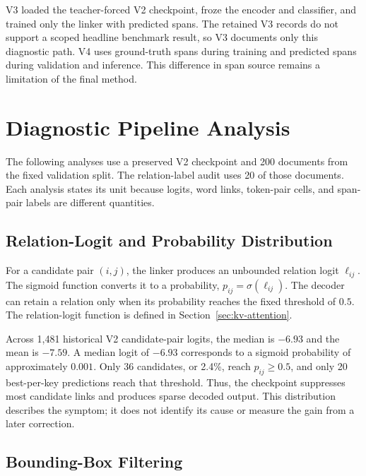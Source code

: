 V3 loaded the teacher-forced V2 checkpoint, froze the encoder and classifier,
and trained only the linker with predicted spans. The retained V3 records do
not support a scoped headline benchmark result, so V3 documents only this
diagnostic path. V4 uses ground-truth spans during training and predicted spans
during validation and inference. This difference in span source remains a
limitation of the final method.

\section{Diagnostic Pipeline Analysis}
\label{sec:exp567}
\label{sec:res567}

The following analyses use a preserved V2 checkpoint and 200 documents from
the fixed validation split. The relation-label audit uses 20 of those documents.
Each analysis states its unit because logits, word links, token-pair cells, and
span-pair labels are different quantities.

\subsection{Relation-Logit and Probability Distribution}

For a candidate pair $(i,j)$, the linker produces an unbounded relation logit
$\ell_{ij}$. The sigmoid function converts it to a probability,
$p_{ij}=\sigma(\ell_{ij})$. The decoder can retain a relation only when its
probability reaches the fixed threshold of $0.5$. The relation-logit function is
defined in Section~\ref{sec:kv-attention}.

Across 1{,}481 historical V2 candidate-pair logits, the median is $-6.93$ and
the mean is $-7.59$. A median logit of $-6.93$ corresponds to a sigmoid
probability of approximately $0.001$. Only 36 candidates, or 2.4\%, reach
$p_{ij}\geq0.5$, and only 20 best-per-key predictions reach that threshold.
Thus, the checkpoint suppresses most candidate links and produces sparse
decoded output. This distribution describes the symptom; it does not identify
its cause or measure the gain from a later correction.

\subsection{Bounding-Box Filtering}

